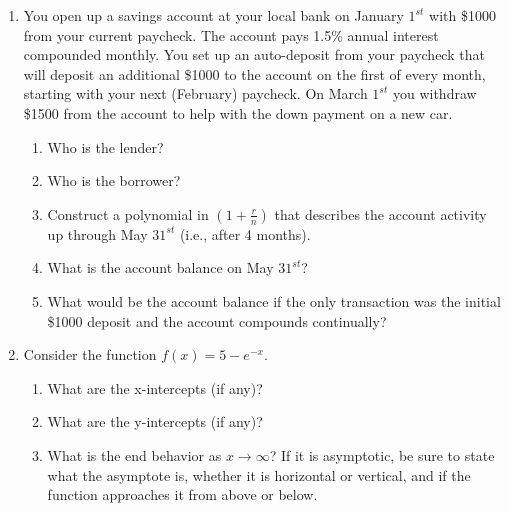 \documentclass[letterpaper,12pt,fleqn]{article}
\begin{document}
\begin{enumerate}

\item You open up a savings account at your local bank on January $1^{st}$ with
\$1000 from your current paycheck.  The account pays 1.5\% annual interest
compounded monthly.  You set up an auto-deposit from your paycheck that will
deposit an additional \$1000 to the account on the first of every month,
starting with your next (February) paycheck.  On March $1^{st}$ you withdraw
\$1500 from the account to help with the down payment on a new car.

\begin{enumerate}
\item Who is the lender?

\vspace{0.25in}

\item Who is the borrower?

\vspace{0.25in}

\item Construct a polynomial in $(1+\frac{r}{n})$ that describes the account
activity up through May $31^{st}$ (i.e., after 4 months).

\vspace{1.5in}

\item What is the account balance on May $31^{st}$?

\vspace{1.0in}

\item What would be the account balance if the only transaction was the
initial \$1000 deposit and the account compounds continually?
\end{enumerate}

\newpage

\item Consider the function $f(x)=5-e^{-x}$.

\begin{enumerate}
\item What are the x-intercepts (if any)?

\vspace{2.0in}

\item What are the y-intercepts (if any)?

\vspace{2.0in}

\item What is the end behavior as $x\to\infty$?  If it is asymptotic, be sure
to state what the asymptote is, whether it is horizontal or vertical, and if
the function approaches it from above or below.


\end{enumerate}
\end{enumerate}
\end{document}

